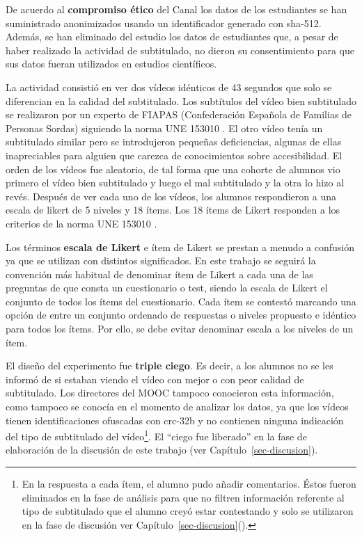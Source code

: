 \documentclass[
  12pt,
  a4paper,
  extrafontsizes,
  onecolumn,
  openright,
  table]{memoir}
\begin{document}
De acuerdo al \textbf{compromiso ético} del Canal los datos de los
estudiantes se han suministrado anonimizados usando un identificador
generado con \gls{sha}-512. Además, se han eliminado del estudio los
datos de estudiantes que, a pesar de haber realizado la actividad de
subtitulado, no dieron su consentimiento para que sus datos fueran
utilizados en estudios científicos.

La actividad consistió en ver dos vídeos idénticos de 43 segundos que
solo se diferencian en la calidad del subtitulado. Los subtítulos del
vídeo bien subtitulado se realizaron por un experto de FIAPAS
(Confederación Española de Familias de Personas Sordas) siguiendo la
norma UNE 153010 \autocite[ver][]{aenor2012}. El otro vídeo tenía un
subtitulado similar pero se introdujeron pequeñas deficiencias, algunas
de ellas inapreciables para alguien que carezca de conocimientos sobre
accesibilidad. El orden de los vídeos fue aleatorio, de tal forma que
una cohorte de alumnos vio primero el vídeo bien subtitulado y luego el
mal subtitulado y la otra lo hizo al revés. Después de ver cada uno de
los vídeos, los alumnos respondieron a una \gls{escala de likert} de 5
niveles y 18 ítems. Los 18 ítems de Likert responden a los criterios de
la norma UNE 153010 \autocite[ver][]{aenor2012}.

Los términos \textbf{escala de Likert} e ítem de Likert se prestan a
menudo a confusión ya que se utilizan con distintos significados. En
este trabajo se seguirá la convención más habitual
\autocite[ver][]{uebersax2006} de denominar ítem de Likert a cada una de
las preguntas de que consta un cuestionario o test, siendo la escala de
Likert el conjunto de todos los ítems del cuestionario. Cada ítem se
contestó marcando una opción de entre un conjunto ordenado de respuestas
o niveles propuesto e idéntico para todos los ítems. Por ello, se debe
evitar denominar escala a los niveles de un ítem.

El diseño del experimento fue \textbf{\gls{triple ciego}}. Es decir, a
los alumnos no se les informó de si estaban viendo el vídeo con mejor o
con peor calidad de subtitulado. Los directores del MOOC tampoco
conocieron esta información, como tampoco se conocía en el momento de
analizar los datos, ya que los vídeos tienen identificaciones ofuscadas
con \gls{crc}-32b y no contienen ninguna indicación del tipo de
subtitulado del vídeo\footnote{En la respuesta a cada ítem, el alumno
  pudo añadir comentarios. Éstos fueron eliminados en la fase de
  análisis para que no filtren información referente al tipo de
  subtitulado que el alumno creyó estar contestando y solo se utilizaron
  en la fase de discusión ver Capítulo~\ref{sec-discusion}().}. El
\enquote{ciego fue liberado} en la fase de elaboración de la discusión
de este trabajo (ver Capítulo~\ref{sec-discusion}).
\end{document}

